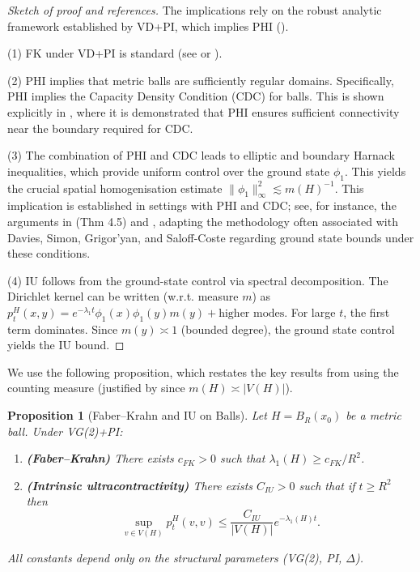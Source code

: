 \documentclass{article}
\numberwithin{equation}{section}
\newtheorem{proposition}[theorem]{Proposition}
\theoremstyle{definition}
\theoremstyle{remark}
\begin{document}
\begin{proof}[Sketch of proof and references]
The implications rely on the robust analytic framework established by VD+PI, which implies PHI ().

(1) FK under VD+PI is standard (see \cite[Ch. 8]{Grigoryan09} or \cite[Prop. 5.1]{BarlowBass04}).

(2) PHI implies that metric balls are sufficiently regular domains. Specifically, PHI implies the Capacity Density Condition (CDC) for balls. This is shown explicitly in \cite[Prop. 3.5]{BarlowBass04}, where it is demonstrated that PHI ensures sufficient connectivity near the boundary required for CDC.

(3) The combination of PHI and CDC leads to elliptic and boundary Harnack inequalities, which provide uniform control over the ground state $\phi_1$. This yields the crucial spatial homogenisation estimate $\|\phi_1\|_{\infty}^2 \lesssim m(H)^{-1}$. This implication is established in settings with PHI and CDC; see, for instance, the arguments in \cite{BarlowBassKumagai09} (Thm 4.5) and \cite{BassKumagai08}, adapting the methodology often associated with Davies, Simon, Grigor'yan, and Saloff-Coste regarding ground state bounds under these conditions.

(4) IU follows from the ground-state control via spectral decomposition. The Dirichlet kernel can be written (w.r.t. measure $m$) as $p_t^H(x,y) = e^{-\lambda_1 t}\phi_1(x)\phi_1(y)m(y) + \text{higher modes}$. For large $t$, the first term dominates. Since $m(y) \asymp 1$ (bounded degree), the ground state control yields the IU bound.
\end{proof}

We use the following proposition, which restates the key results from  using the counting measure (justified by  since $m(H) \asymp |V(H)|$).

\begin{proposition}[Faber--Krahn and IU on Balls]\label{prop:IU}
Let $H=B_R(x_0)$ be a metric ball. Under VG(2)+PI:
\begin{enumerate}
    \item \textbf{(Faber--Krahn)} There exists $c_{FK}>0$ such that $\lambda_1(H)\ge c_{FK}/R^{2}$.
    \item \textbf{(Intrinsic ultracontractivity)} There exists $C_{IU}>0$ such that if $t\ge R^{2}$ then
    \begin{equation}\label{eq:IU}
        \sup_{v \in V(H)} p_t^H(v,v) \leq \frac{C_{IU}}{|V(H)|} e^{-\lambda_1(H) t}.
    \end{equation}
\end{enumerate}
All constants depend only on the structural parameters (VG(2), PI, $\Delta$).
\end{proposition}
\end{document}
